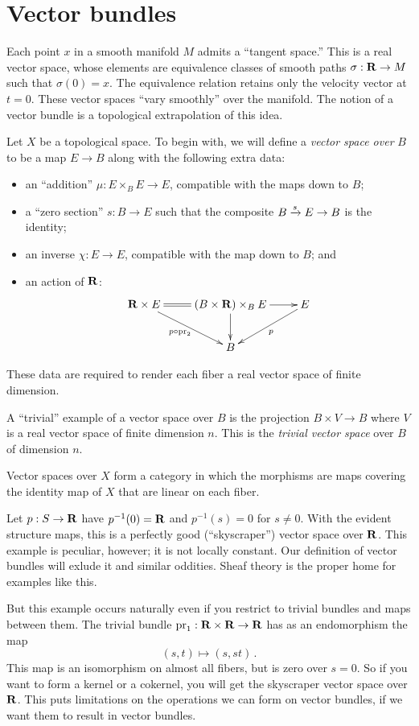 \section{Vector bundles}

Each point $x$ in a smooth manifold $M$ admits a ``tangent space.'' This is a
real vector space, whose elements are equivalence classes of smooth
paths $\sigma:\mathbf R\to M$ such that $\sigma(0)=x$. The equivalence 
relation retains only the velocity vector at $t=0$. These vector spaces
``vary smoothly'' over the manifold. The notion of a vector bundle is a
topological extrapolation of this idea. 

Let $X$ be a topological space. To begin with, we will define a
{\em  vector space over} $B$ to be a map $E\to B$ along with
the following extra data:
\begin{itemize}
    \item an ``addition'' $\mu:E\times_B E\to E$, compatible with the maps
	down to $B$;
    \item a ``zero section'' $s:B\to E$ such that the composite $B\xrightarrow{{s}}E\to
	B$ is the identity;
    \item an inverse $\chi:E\to E$, compatible with the map down to $B$; and
    \item an action of $\mathbf R$:
	\begin{equation*}
	    \xymatrix{
		\RR\times E\ar[dr]_{p\circ \pr_2}\ar@{=}[r] &
		(B\times\RR)\times_B E\ar[r]\ar[d] & E\ar[dl]^p\\
		& B &
	    }
	\end{equation*}
\end{itemize}
These data are required to render each fiber a real vector space of finite
dimension. 
\begin{example}\label{trivialvectorbundle}
    A ``trivial'' example of a vector space over $B$ is the projection
    $B\times V\to B$ where $V$ is a real vector space of finite dimension $n$.
This is the {\em trivial vector space} over $B$ of dimension $n$.
\end{example}
Vector spaces over $X$ form a category in which the morphisms are maps 
covering the identity map of $X$ that are linear on each fiber. 

\begin{example}
Let $p:S\to\mathbf R$ have $p^{-1}(0)=\mathbf R$ and $p^{-1}(s)=0$ for $s\neq0$. 
With the evident structure maps, this is a perfectly good (``skyscraper'') 
vector space over $\mathbf R$. This example is peculiar, however; it is not
locally constant. Our definition of vector bundles will exlude it and
similar oddities. Sheaf theory is the proper home for examples like this.

But this example occurs naturally even if you restrict to trivial 
bundles and maps between them. The trivial bundle 
$\mathrm{pr}_1:\mathbf R\times\mathbf R\rightarrow\mathbf R$
has as an endomorphism the map 
\[
(s,t)\mapsto(s,st)\,.
\]
This map is an isomorphism on almost all fibers, but is zero over $s=0$.
So if you want to form a kernel or a cokernel, you will get the skyscraper 
vector space over $\mathbf R$. This puts limitations on the operations we can form 
on vector bundles, if we want them to result in vector bundles. 
\end{example}

